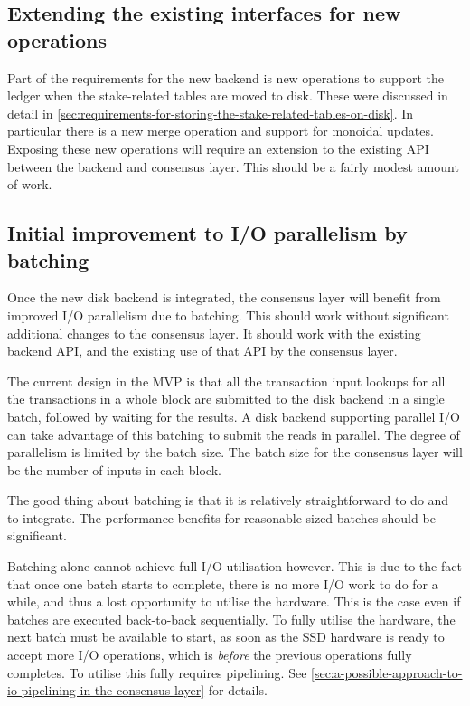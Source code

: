 \documentclass[11pt,a4paper]{article}
\begin{document}
\subsection{Extending the existing interfaces for new operations}
\label{sec:extending-the-existing-interfaces-for-new-operations}

Part of the requirements for the new backend is new operations to support the
ledger when the stake-related tables are moved to disk. These were discussed in
detail in \cref{sec:requirements-for-storing-the-stake-related-tables-on-disk}.
In particular there is a new {\sc merge} operation and support for monoidal
updates. Exposing these new operations will require an extension to the
existing API between the backend and consensus layer. This should be a fairly
modest amount of work.

\subsection{Initial improvement to I/O parallelism by batching}

Once the new disk backend is integrated, the consensus layer will benefit from
improved I/O parallelism due to batching. This should work without significant
additional changes to the consensus layer. It should work with the existing
backend API, and the existing use of that API by the consensus layer.

The current design in the MVP is that all the transaction input lookups for all
the transactions in a whole block are submitted to the disk backend in a single
batch, followed by waiting for the results. A disk backend supporting parallel
I/O can take advantage of this batching to submit the reads in parallel. The
degree of parallelism is limited by the batch size. The batch size for the
consensus layer will be the number of inputs in each block.

The good thing about batching is that it is relatively straightforward to do
and to integrate. The performance benefits for reasonable sized batches should
be significant.

Batching alone cannot achieve full I/O utilisation however. This is due to the
fact that once one batch starts to complete, there is no more I/O work to do
for a while, and thus a lost opportunity to utilise the hardware. This is the
case even if batches are executed back-to-back sequentially. To fully utilise
the hardware, the next batch must be available to start, as soon as the SSD
hardware is ready to accept more I/O operations, which is \emph{before} the
previous operations fully completes. To utilise this fully requires pipelining.
See \cref{sec:a-possible-approach-to-io-pipelining-in-the-consensus-layer} for
details.
\end{document}
